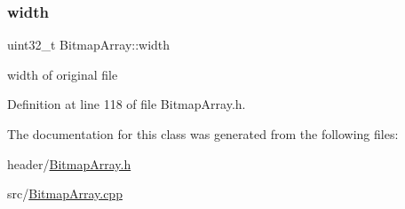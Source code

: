 \subsubsection{\texorpdfstring{width}{width}}
{\footnotesize\ttfamily uint32\+\_\+t Bitmap\+Array\+::width\hspace{0.3cm}{\ttfamily [private]}}

width of original file 

Definition at line 118 of file Bitmap\+Array.\+h.



The documentation for this class was generated from the following files\+:\begin{DoxyCompactItemize}
\item 
header/\mbox{\hyperlink{BitmapArray_8h}{Bitmap\+Array.\+h}}\item 
src/\mbox{\hyperlink{BitmapArray_8cpp}{Bitmap\+Array.\+cpp}}\end{DoxyCompactItemize}
